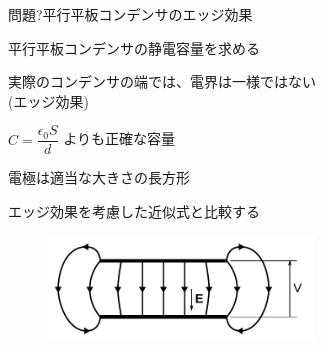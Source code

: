 \documentclass[dvipdfmx]{beamer}
\newenvironment{wideitemize}{\itemize\setlength{\itemsep}{1em}}{\enditemize}
\newenvironment{wideitemize2}{\itemize\setlength{\itemsep}{0.2em}}{\enditemize}
\begin{document}
\begin{frame}{問題?}{平行平板コンデンサのエッジ効果}
\begin{wideitemize}
\item 平行平板コンデンサの静電容量を求める
\begin{wideitemize2}
\item 実際のコンデンサの端では、電界は一様ではない \\
(エッジ効果)
\item $C=\dfrac{\epsilon_0 S}{d}$ よりも正確な容量
\item 電極は適当な大きさの長方形
\item エッジ効果を考慮した近似式と比較する
\end{wideitemize2}
\end{wideitemize}

\begin{figure}[htbp]
    \centering
    \includegraphics[width=200pt]{svg/capacitor.pdf}
\end{figure}
\end{frame}
\end{document}
